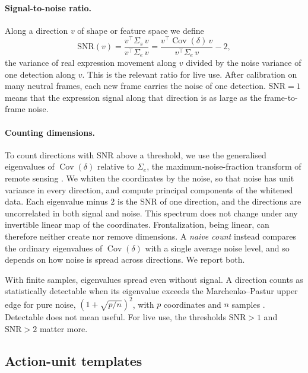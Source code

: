 \documentclass[11pt,a4paper]{article}
\newcommand{\Cov}{\operatorname{Cov}}
\newcommand{\SNR}{\mathrm{SNR}}
\begin{document}
\paragraph{Signal-to-noise ratio.} Along a direction $v$ of shape or feature space we define
\begin{equation}\label{eq:snr}
  \SNR(v) = \frac{v^\top \Sigma_s\, v}{v^\top \Sigma_e\, v}
          = \frac{v^\top \Cov(\delta)\, v}{v^\top \Sigma_e\, v} - 2 ,
\end{equation}
the variance of real expression movement along $v$ divided by the noise variance of one detection
along $v$. This is the relevant ratio for live use. After calibration on many neutral frames, each
new frame carries the noise of one detection. $\SNR = 1$ means that the expression signal along
that direction is as large as the frame-to-frame noise.

\paragraph{Counting dimensions.} To count directions with SNR above a threshold, we use the
generalised eigenvalues of $\Cov(\delta)$ relative to $\Sigma_e$, the maximum-noise-fraction
transform of remote sensing \citep{green1988mnf}. We whiten the coordinates by the noise, so that
noise has unit variance in every direction, and compute principal components of the whitened data.
Each eigenvalue minus 2 is the SNR of one direction, and the directions are uncorrelated in both
signal and noise. This spectrum does not change under any invertible linear map of the
coordinates. Frontalization, being linear, can therefore neither create nor remove dimensions. A
\emph{naive count} instead compares the ordinary eigenvalues of $\Cov(\delta)$ with a single
average noise level, and so depends on how noise is spread across directions. We report both.

With finite samples, eigenvalues spread even without signal. A direction counts as statistically
detectable when its eigenvalue exceeds the Marchenko--Pastur upper edge for pure noise,
$(1+\sqrt{p/n})^2$, with $p$ coordinates and $n$ samples \citep{marchenko1967distribution}.
Detectable does not mean useful. For live use, the thresholds $\SNR > 1$ and $\SNR > 2$ matter more.

\subsection{Action-unit templates}
\end{document}
